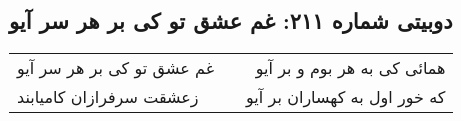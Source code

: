 \begin{center}
\section*{دوبیتی شماره ۲۱۱: غم عشق تو کی بر هر سر آیو}
\label{sec:211}
\begin{longtable}{l p{0.5cm} r}
غم عشق تو کی بر هر سر آیو
&&
همائی کی به هر بوم و بر آیو
\\
زعشقت سرفرازان کامیابند
&&
که خور اول به کهساران بر آیو
\\
\end{longtable}
\end{center}
